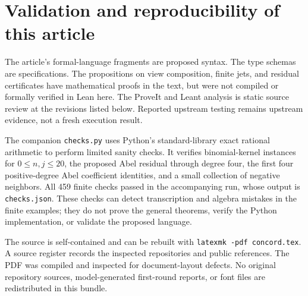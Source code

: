 \documentclass[11pt,a4paper]{article}
\newcommand{\code}[1]{\nolinkurl{#1}}
\theoremstyle{definition}
\begin{document}
\clearpage
\section{Validation and reproducibility of this article}\label{app:validation}

The article's formal-language fragments are proposed syntax. The type schemas are specifications. The propositions on view composition, finite jets, and residual certificates have mathematical proofs in the text, but were not compiled or formally verified in Lean here. The ProveIt and Leant analysis is static source review at the revisions listed below. Reported upstream testing remains upstream evidence, not a fresh execution result.

The companion \code{checks.py} uses Python's standard-library exact rational arithmetic to perform limited sanity checks. It verifies binomial-kernel instances for \(0\le n,j\le20\), the proposed Abel residual through degree four, the first four positive-degree Abel coefficient identities, and a small collection of negative neighbors. All 459 finite checks passed in the accompanying run, whose output is \code{checks.json}. These checks can detect transcription and algebra mistakes in the finite examples; they do not prove the general theorems, verify the Python implementation, or validate the proposed language.

The source is self-contained and can be rebuilt with \code{latexmk -pdf concord.tex}. A source register records the inspected repositories and public references. The PDF was compiled and inspected for document-layout defects. No original repository sources, model-generated first-round reports, or font files are redistributed in this bundle.
\end{document}
